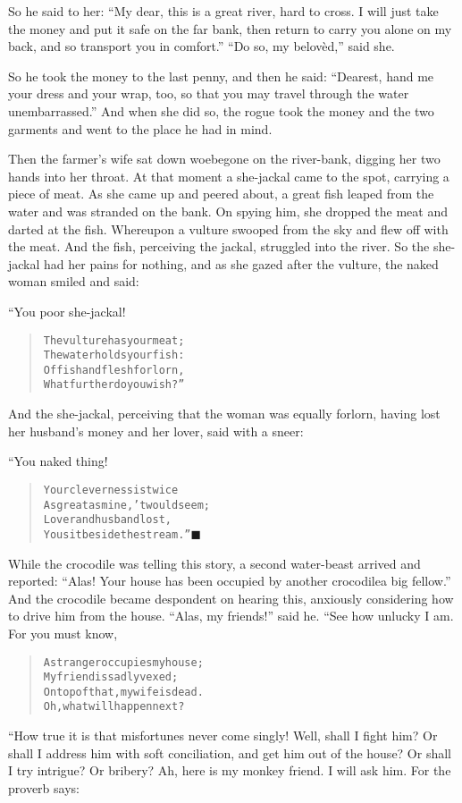 \documentclass[article, twoside, 14pt]{memoir}
\newcommand{\qed}{\hfill \ensuremath{\blacksquare}}
\renewenvironment{verbatim}{%
\begin{quote}%
\vskip -10pt%
\begin{alltt}\normalfont\large}{\end{alltt}%
\end{quote}%
\vskip -10pt
} %
\begin{document}
So he said to her:
``My dear, this is a great river, hard to cross. I will just take the money and put it safe on the far bank, then return to carry you alone on my back, and so transport you in comfort.''
``Do so, my belovèd,'' said she.

So he took the money to the last penny, and then he said:
``Dearest, hand me your dress and your wrap, too, so that you may travel through the water unembarrassed.''
And when she did so, the rogue took the money and the two garments
and went to the place he had in mind.

Then the farmer's wife sat down woebegone on the river-bank,
digging her two hands into her throat. At that moment a she-jackal
came to the spot, carrying a piece of meat. As she came up and
peered about, a great fish leaped from the water and was stranded
on the bank. On spying him, she dropped the meat and darted at the
fish. Whereupon a vulture swooped from the sky and flew off with
the meat. And the fish, perceiving the jackal, struggled into the
river. So the she-jackal had her pains for nothing, and as she
gazed after the vulture, the naked woman smiled and said:

“You poor she-jackal!

\begin{verbatim}
The vulture has your meat;
    The water holds your fish:
Of fish and flesh forlorn,
    What further do you wish?”
\end{verbatim}
And the she-jackal, perceiving that the woman was equally forlorn,
having lost her husband's money and her lover, said with a sneer:

“You naked thing!

\begin{verbatim}
Your cleverness is twice
    As great as mine, 'twould seem;
Lover and husband lost,
    You sit beside the stream.”\hyperref[s74]{\qed}
\end{verbatim}
While the crocodile was telling this story, a second water-beast
arrived and reported:
``Alas! Your house has been occupied by another crocodile{\textemdash}a big fellow.''
And the crocodile became despondent on hearing this, anxiously
considering how to drive him from the house. ``Alas, my friends!''
said he. “See how unlucky I am. For you must know,

\begin{verbatim}
A stranger occupies my house;
    My friend is sadly vexed;
On top of that, my wife is dead.
    Oh, what will happen next?
\end{verbatim}
“How true it is that misfortunes never come singly! Well,
shall I fight him? Or shall I address him with soft conciliation,
and get him out of the house? Or shall I try intrigue? Or bribery?
Ah, here is my monkey friend. I will ask him. For the proverb
says:
\end{document}
